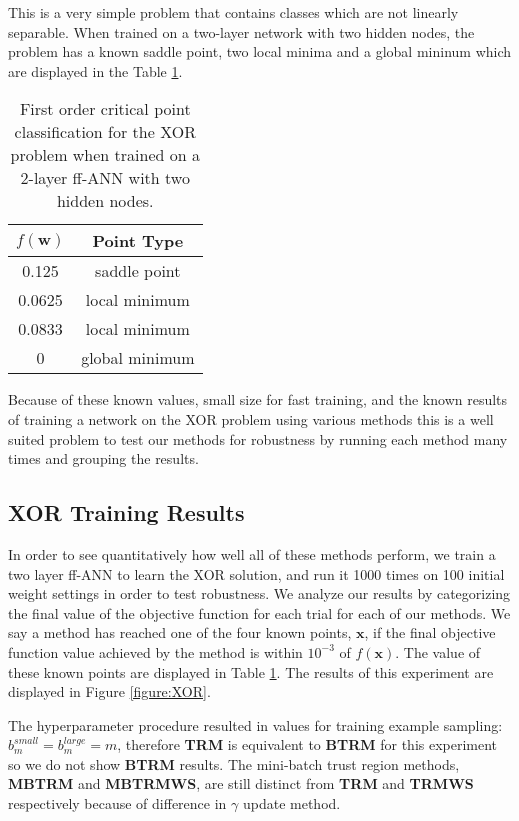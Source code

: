\documentclass[letterpaper,12pt,titlepage,oneside,final]{book}
\begin{document}
	This is a very simple problem that contains classes which are not linearly separable. When trained on a two-layer network with two hidden nodes, the problem has a known saddle point, two local minima and a global mininum which are displayed in the Table \ref{table:XOR_point_type}.
	
	\begin{table}[h] 
		\centering 
		\begin{tabular}{ |c|c| } 
			\hline 
			$f(\mathbf{w})$ & \textbf{Point Type}\\ 
			\hline
			0.125 & saddle point\\  
			0.0625 & local minimum\\ 
			0.0833 & local minimum\\ 
			0 & global minimum\\ 
			\hline 
		\end{tabular} 
		\caption{First order critical point classification for the XOR problem when trained on a 2-layer ff-ANN with two hidden nodes.} \label{table:XOR_point_type} \end{table}
	
	Because of these known values, small size for fast training, and the known results of training a network on the XOR problem using various methods this is a well suited problem to test our methods for robustness by running each method many times and grouping the results. 
	
	\subsection{XOR Training Results}
	
	In order to see quantitatively how well all of these methods perform, we train a two layer ff-ANN to learn the XOR solution, and run it 1000 times on 100 initial weight settings in order to test robustness. We analyze our results by categorizing the final value of the objective function for each trial for each of our methods. We say a method has reached one of the four known points, $\mathbf{x}$, if the final objective function value achieved by the method is within $10^{-3}$ of $f(\mathbf{x})$. The value of these known points are displayed in Table \ref{table:XOR_point_type}. The results of this experiment are displayed in Figure \ref{figure:XOR}.
	
	 The hyperparameter procedure resulted in values for training example sampling: $b_{m}^{small} = b_{m}^{large} = m$, therefore \textbf{TRM} is equivalent to \textbf{BTRM} for this experiment so we do not show \textbf{BTRM} results. The mini-batch trust region methods, \textbf{MBTRM} and \textbf{MBTRMWS}, are still distinct from \textbf{TRM} and \textbf{TRMWS} respectively because of difference in $\gamma$ update method.  
	
\end{document}
